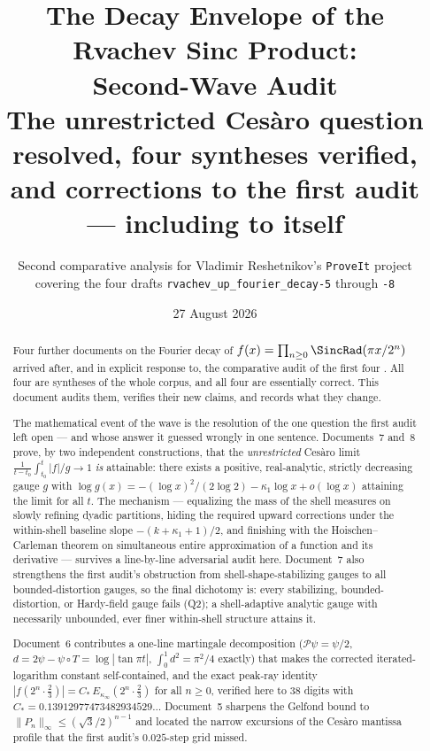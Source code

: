 \documentclass[11pt,oneside]{article}
\title{\bfseries The Decay Envelope of the Rvachev Sinc Product:\\
Second-Wave Audit\\[0.35em]
\large The unrestricted Ces\`aro question resolved, four syntheses verified,\\
and corrections to the first audit --- including to itself}
\author{Second comparative analysis for Vladimir Reshetnikov's \texttt{ProveIt} project\\
\small covering the four drafts \nolinkurl{rvachev_up_fourier_decay-5} through \nolinkurl{-8}}
\date{27 August 2026}
\theoremstyle{definition}
\theoremstyle{remark}
\begin{document}
\maketitle

\begin{abstract}
Four further documents on the Fourier decay of
$f(x)=\prod_{n\ge0}\SincRad(\pi x/2^n)$ arrived after, and in explicit
response to, the comparative audit of the first four
\cite{audit}.  All four are syntheses of the whole corpus, and all four
are essentially correct.  This document audits them, verifies their new
claims, and records what they change.

The mathematical event of the wave is the resolution of the one question
the first audit left open --- and whose answer it guessed wrongly in one
sentence.  Documents~7 and~8 prove, by two independent constructions,
that the \emph{unrestricted} Ces\`aro limit
$\frac1{t-t_0}\int_{t_0}^t|f|/g\to1$ \emph{is} attainable: there exists a
positive, real-analytic, strictly decreasing gauge $g$ with
$\log g(x)=-(\log x)^2/(2\log2)-\kappa_1\log x+o(\log x)$ attaining the
limit for all $t$.  The mechanism --- equalizing the mass of the shell
measures on slowly refining dyadic partitions, hiding the required
upward corrections under the within-shell baseline slope
$-(k+\kappa_1+1)/2$, and finishing with the Hoischen--Carleman theorem
on simultaneous entire approximation of a function and its derivative
--- survives a line-by-line adversarial audit here.  Document~7 also
strengthens the first audit's obstruction from shell-shape-stabilizing
gauges to all bounded-distortion gauges, so the final dichotomy is:
every stabilizing, bounded-distortion, or Hardy-field gauge fails
(Q2); a shell-adaptive analytic gauge with necessarily unbounded,
ever finer within-shell structure attains it.

Document~6 contributes a one-line martingale decomposition
($\mathcal P\psi=\psi/2$, $d=2\psi-\psi\circ T=\log|\tan\pi t|$,
$\int_0^1d^2=\pi^2/4$ exactly) that makes the corrected iterated-logarithm
constant self-contained, and the exact peak-ray identity
$|f(2^n\cdot\tfrac23)|=C_*\,E_{\kappa_\infty}(2^n\cdot\tfrac23)$ for all
$n\ge0$, verified here to $38$ digits with
$C_*=0.13912977473482934529\ldots$  Document~5 sharpens the Gelfond
bound to $\|P_n\|_\infty\le(\sqrt3/2)^{n-1}$ and located the narrow
excursions of the Ces\`aro mantissa profile that the first audit's
$0.025$-step grid missed.


\end{abstract}
\end{document}
